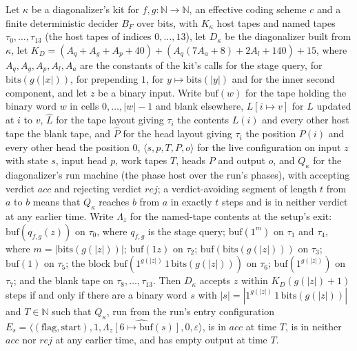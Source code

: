 \begin{theorem}
\label{Turing.NTimeDiag.dz_accepts_iff}
\leanok
{}
Let $\kappa$ be a diagonalizer's kit for $f, g : \mathbb{N} \to \mathbb{N}$, an effective coding scheme $c$ and a finite deterministic decider $B_F$ over bits, with $K_\kappa$ host tapes and named tapes $\tau_0, \dots, \tau_{13}$ (the host tapes of indices $0, \dots, 13$), let $D_\kappa$ be the diagonalizer built from $\kappa$, let $K_D = (A_q + A_g + A_p + 40) + (A_q(7A_a + 8) + 2A_l + 140) + 15$, where $A_q, A_g, A_p, A_l, A_a$ are the constants of the kit's calls for the stage query, for $\mathrm{bits}(g(|x|))$, for prepending $1$, for $y \mapsto \mathrm{bits}(|y|)$ and for the inner second component, and let $z$ be a binary input. Write $\mathrm{buf}(w)$ for the tape holding the binary word $w$ in cells $0, \dots, |w| - 1$ and blank elsewhere, $L[i \mapsto v]$ for $L$ updated at $i$ to $v$, $\hat L$ for the tape layout giving $\tau_i$ the contents $L(i)$ and every other host tape the blank tape, and $\hat P$ for the head layout giving $\tau_i$ the position $P(i)$ and every other head the position $0$, $\langle s, p, T, P, o\rangle$ for the live configuration on input $z$ with state $s$, input head $p$, work tapes $T$, heads $P$ and output $o$, and $Q_\kappa$ for the diagonalizer's run machine (the phase host over the run's phases), with accepting verdict $\mathit{acc}$ and rejecting verdict $\mathit{rej}$; a verdict-avoiding segment of length $t$ from $a$ to $b$ means that $Q_\kappa$ reaches $b$ from $a$ in exactly $t$ steps and is in neither verdict at any earlier time. Write $\Lambda_z$ for the named-tape contents at the setup's exit: $\mathrm{buf}(q_{f,g}(z))$ on $\tau_0$, where $q_{f,g}$ is the stage query; $\mathrm{buf}(1^m)$ on $\tau_1$ and $\tau_4$, where $m = |\mathrm{bits}(g(|z|))|$; $\mathrm{buf}(1z)$ on $\tau_2$; $\mathrm{buf}(\mathrm{bits}(g(|z|)))$ on $\tau_3$; $\mathrm{buf}(1)$ on $\tau_5$; the block $\mathrm{buf}(1^{g(|z|)}\,1\,\mathrm{bits}(g(|z|)))$ on $\tau_6$; $\mathrm{buf}(1^{g(|z|)})$ on $\tau_7$; and the blank tape on $\tau_8, \dots, \tau_{13}$. Then $D_\kappa$ accepts $z$ within $K_D(g(|z|) + 1)$ steps if and only if there are a binary word $s$ with $|s| = |1^{g(|z|)}\,1\,\mathrm{bits}(g(|z|))|$ and $T \in \mathbb{N}$ such that $Q_\kappa$, run from the run's entry configuration $E_s = \langle (\text{flag}, \text{start}), 1, \widehat{\Lambda_z[6 \mapsto \mathrm{buf}(s)]}, 0, \varepsilon\rangle$, is in $\mathit{acc}$ at time $T$, is in neither $\mathit{acc}$ nor $\mathit{rej}$ at any earlier time, and has empty output at time $T$.

\end{theorem}
